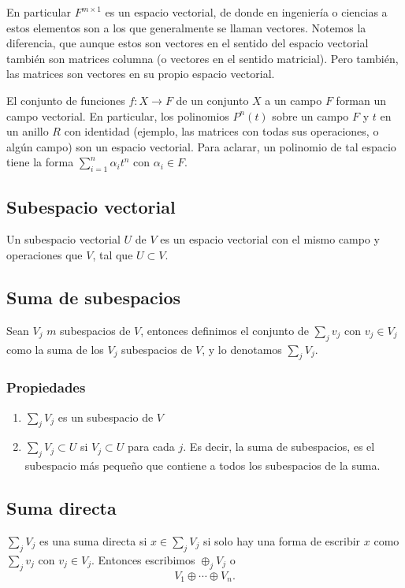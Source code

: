 \documentclass{article}
\begin{document}
En particular $F^{m\times 1}$ es un espacio vectorial, de donde
en ingeniería o ciencias a estos elementos son a los que generalmente se llaman vectores. Notemos la diferencia, que aunque estos son vectores en el sentido del espacio vectorial también son matrices columna (o vectores en el sentido matricial). Pero también, las matrices son vectores en su propio espacio vectorial.

El conjunto de funciones $f: X \rightarrow F$ de un conjunto $X$
a un campo $F$ forman un campo vectorial. En particular, los polinomios $P^n(t)$ sobre un campo $F$ y $t$ en un anillo $R$ con identidad (ejemplo, las matrices con todas sus operaciones, o algún campo) son un espacio vectorial. Para aclarar, un polinomio de tal espacio tiene
la forma $\sum^n_{i=1} \alpha_i t^n$ con $\alpha_i\in F$.

\subsection{Subespacio vectorial}
Un subespacio vectorial $U$ de $V$ es un espacio vectorial
con el mismo campo y operaciones que $V$, tal que $U\subset V$.

\subsection{Suma de subespacios}
Sean $V_j$ $m$ subespacios de $V$, entonces definimos el conjunto
de $\sum_j v_j$ con $v_j\in V_j$ como la suma de los $V_j$ subespacios
de $V$, y lo denotamos $\sum_j V_j$.
\subsubsection*{Propiedades}
\begin{enumerate}
    \item $\sum_j V_j$ es un subespacio de $V$
    \item $\sum_j V_j\subset U$ si $V_j\subset U$ para cada $j$.
    Es decir, la suma de subespacios, es el subespacio más pequeño
    que contiene a todos los subespacios de la suma.
\end{enumerate}

\subsection{Suma directa}
$\sum_j V_j$ es una suma directa si $x\in\sum_j V_j$
si solo hay una forma de escribir $x$ como  $\sum_j v_j$
con $v_j\in V_j$. Entonces escribimos $\oplus_j V_j$
o $$V_1\oplus\cdots\oplus V_n.$$
\end{document}
